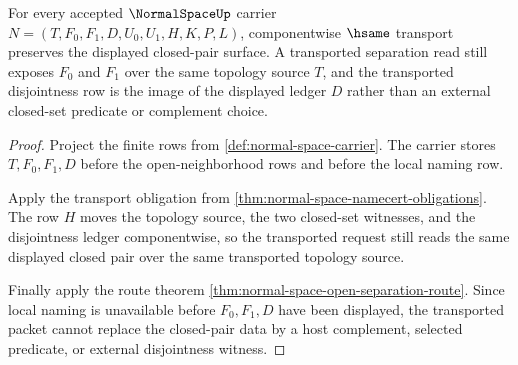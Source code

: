 \begin{theorem}
\label{thm:normal-space-closed-pair-transport}
For every accepted $\NormalSpaceUp$ carrier $N=(T,F_0,F_1,D,U_0,U_1,H,K,P,L)$, componentwise $\hsame$ transport preserves the displayed closed-pair surface. A transported separation read still exposes $F_0$ and $F_1$ over the same topology source $T$, and the transported disjointness row is the image of the displayed ledger $D$ rather than an external closed-set predicate or complement choice.
\end{theorem}
\begin{proof}
Project the finite rows from \autoref{def:normal-space-carrier}. The carrier stores $T,F_0,F_1,D$ before the open-neighborhood rows and before the local naming row.

Apply the transport obligation from \autoref{thm:normal-space-namecert-obligations}. The row $H$ moves the topology source, the two closed-set witnesses, and the disjointness ledger componentwise, so the transported request still reads the same displayed closed pair over the same transported topology source.

Finally apply the route theorem \autoref{thm:normal-space-open-separation-route}. Since local naming is unavailable before $F_0,F_1,D$ have been displayed, the transported packet cannot replace the closed-pair data by a host complement, selected predicate, or external disjointness witness.
\end{proof}

